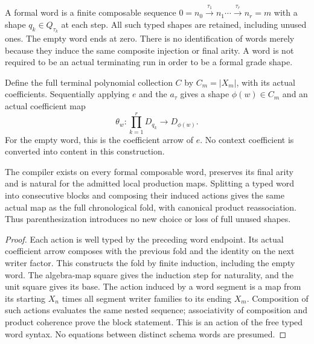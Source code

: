 \documentclass[11pt]{article}
\begin{document}
A formal word is a finite composable sequence
$0=n_0\xrightarrow{\tau_1}n_1\cdots\xrightarrow{\tau_r}n_r=m$
with a shape $q_k\in Q_{\tau_k}$ at each step. All such typed shapes are retained, including unused ones. The empty word ends at zero. There is no identification of words merely because they induce the same composite injection or final arity. A word is not required to be an actual terminating run in order to be a formal grade shape.

Define the full terminal polynomial collection $C$ by $C_m=|X_m|$, with its actual coefficients. Sequentially applying $e$ and the $a_\tau$ gives a shape $\phi(w)\in C_m$ and an actual coefficient map
\[
 \theta_w:\prod_{k=1}^r D_{q_k}\longrightarrow D_{\phi(w)}.
\]
For the empty word, this is the coefficient arrow of $e$. No context coefficient is converted into content in this construction.

\begin{theorem}
The compiler exists on every formal composable word, preserves its final arity and is natural for the admitted local production maps. Splitting a typed word into consecutive blocks and composing their induced actions gives the same actual map as the full chronological fold, with canonical product reassociation. Thus parenthesization introduces no new choice or loss of full unused shapes.
\end{theorem}
\begin{proof}
Each action is well typed by the preceding word endpoint. Its actual coefficient arrow composes with the previous fold and the identity on the next writer factor. This constructs the fold by finite induction, including the empty word. The algebra-map square gives the induction step for naturality, and the unit square gives its base. The action induced by a word segment is a map from its starting $X_n$ times all segment writer families to its ending $X_m$. Composition of such actions evaluates the same nested sequence; associativity of composition and product coherence prove the block statement. This is an action of the free typed word syntax. No equations between distinct schema words are presumed.
\end{proof}
\end{document}
